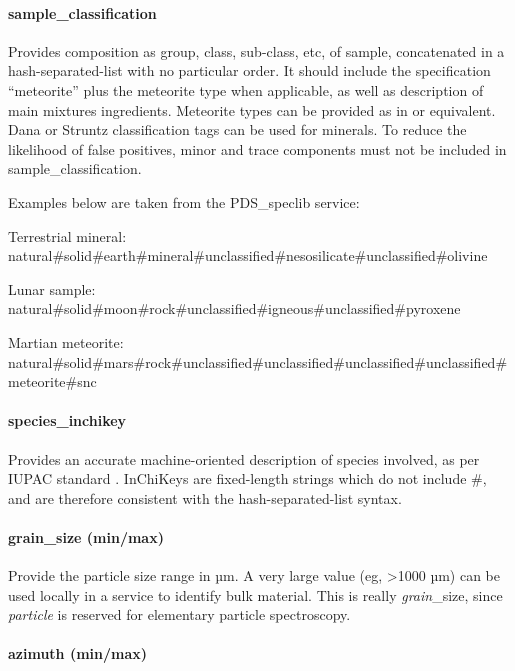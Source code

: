 \documentclass[11pt,a4paper]{ivoa}
\begin{document}
\paragraph{sample\_classification}

Provides composition as group, class, sub-class, etc, of sample,
concatenated in a hash-separated-list with no particular order. It should include the specification ``meteorite''
plus the meteorite type when applicable, as well as description of main mixtures ingredients.
Meteorite types can be provided as in \citep{Krot:2005mz} or equivalent. Dana \citep{dana:1997}
or Struntz \citep{strunz2001} classification tags can be used for minerals. To reduce the likelihood
of false positives, minor and trace components must not be included in sample\_classification.

Examples below are taken from the PDS\_speclib service:
\begin{bigdescription}
\item[Terrestrial mineral:]
 natural\#solid\#earth\#mineral\#unclassified\#nesosilicate\#unclassified\#olivine
\item[Lunar sample:]
 natural\#solid\#moon\#rock\#unclassified\#igneous\#unclassified\#pyroxene
\item[Martian meteorite:]
 natural\#solid\#mars\#rock\#unclassified\#unclassified\#unclassified\#unclassified\#meteorite\#snc
\end{bigdescription}

\paragraph{\textbf{species\_inchikey} }

Provides an accurate machine-oriented description of species involved,
as per IUPAC standard \citep{heller2015}. InChiKeys are fixed-length strings
which do not include \#, and are therefore consistent with the
hash-separated-list syntax.

\paragraph{grain\_size (min/max)}

Provide the particle size range in µm. A very large value (eg, >1000
µm) can be used locally in a service to identify bulk material.
This is really \emph{grain}\_size, since \emph{particle}
is reserved for elementary particle spectroscopy.

\paragraph{azimuth (min/max)}
\end{document}
